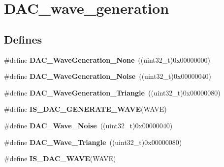 \hypertarget{group__DAC__wave__generation}{
\section{DAC\_\-wave\_\-generation}
\label{group__DAC__wave__generation}
}
\subsection*{Defines}
\begin{DoxyCompactItemize}
\item 
\hypertarget{group__DAC__wave__generation_gaabbcd575d6106267f6b65ce988158f29}{
\#define {\bfseries DAC\_\-WaveGeneration\_\-None}~((uint32\_\-t)0x00000000)}
\label{group__DAC__wave__generation_gaabbcd575d6106267f6b65ce988158f29}

\item 
\hypertarget{group__DAC__wave__generation_ga1692990325098cae6f32182c1fa0f61e}{
\#define {\bfseries DAC\_\-WaveGeneration\_\-Noise}~((uint32\_\-t)0x00000040)}
\label{group__DAC__wave__generation_ga1692990325098cae6f32182c1fa0f61e}

\item 
\hypertarget{group__DAC__wave__generation_ga68f1a71011437a5ea6298ab039554714}{
\#define {\bfseries DAC\_\-WaveGeneration\_\-Triangle}~((uint32\_\-t)0x00000080)}
\label{group__DAC__wave__generation_ga68f1a71011437a5ea6298ab039554714}

\item 
\#define {\bfseries IS\_\-DAC\_\-GENERATE\_\-WAVE}(WAVE)
\item 
\hypertarget{group__DAC__wave__generation_ga09c5ee68f8e726b1c039df1f6e195965}{
\#define {\bfseries DAC\_\-Wave\_\-Noise}~((uint32\_\-t)0x00000040)}
\label{group__DAC__wave__generation_ga09c5ee68f8e726b1c039df1f6e195965}

\item 
\hypertarget{group__DAC__wave__generation_ga95a1566e1728e1e345e8f3b50629a075}{
\#define {\bfseries DAC\_\-Wave\_\-Triangle}~((uint32\_\-t)0x00000080)}
\label{group__DAC__wave__generation_ga95a1566e1728e1e345e8f3b50629a075}

\item 
\#define {\bfseries IS\_\-DAC\_\-WAVE}(WAVE)
\end{DoxyCompactItemize}


